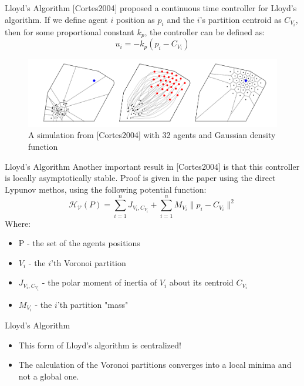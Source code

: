 \documentclass[t]{beamer}
\newcommand{\norm}[1]{\lVert #1 \rVert}
\begin{document}
\begin{frame}[label=lloydsalg6]{Lloyd's Algorithm}
[Cortes2004] proposed a continuous time controller for Lloyd's algorithm. If we define agent $i$ position as $p_i$ and the $i$'s partition centroid as $C_{V_{i}}$, then for some proportional constant $k_{p}$, the controller can be defined as:
\begin{equation*} \label{Lloyds contoller}
u_{i} = -k_{p}\left( p_i - C_{V_{i}} \right)
\end{equation*}

\begin{figure}[b]
\centering
\includegraphics[scale=0.3]{background/Lloyds-alg-from-cortes.png}
\caption{A simulation from [Cortes2004] with 32 agents and Gaussian density function}
\end{figure}
\end{frame}
\begin{frame}[label=lloydsalg7]{Lloyd's Algorithm}
Another important result in [Cortes2004] is that this controller is locally asymptotically stable. Proof is given in the paper using the direct Lypunov methos, using the following potential function:
\begin{equation*}
\mathcal{H_{V}}\left( P \right) = \sum_{i=1}^{n} J_{V_i,C_{V_i}} + \sum_{i=1}^{n} M_{V_i} \norm{p_i - C_{V_i}}^2
\end{equation*}
Where:
\begin{itemize}
\item P - the set of the agents positions
\item $V_i$ - the $i$'th Voronoi partition
\item $J_{V_i,C_{V_i}}$ - the polar moment of inertia of $V_i$ about its centroid $C_{V_i}$
\item $M_{V_i}$ - the $i$'th partition "mass"
\end{itemize}
\end{frame}
\begin{frame}[label=lloydsalg8]{Lloyd's Algorithm}
\begin{itemize}
\item This form of Lloyd's algorithm is centralized!
\item The calculation of the Voronoi partitions converges into a local minima and not a global one.
\end{itemize}

\end{frame}
\end{document}
